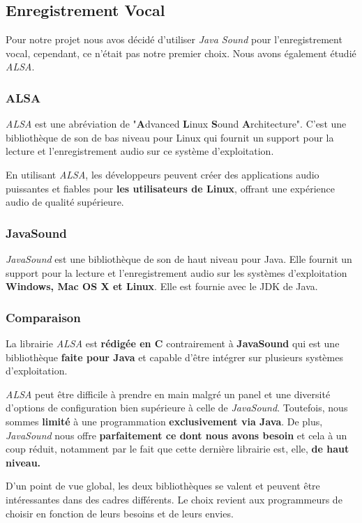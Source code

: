 \subsection{Enregistrement Vocal}
\label{subsec:javaSound}

Pour notre projet nous avos décidé d'utiliser \textit{Java Sound} pour l'enregistrement vocal, cependant,
ce n'était pas notre premier choix. Nous avons également étudié \textit{ALSA}.

\subsubsection*{ALSA}

\textit{ALSA} est une abréviation de "\textbf{A}dvanced \textbf{L}inux \textbf{S}ound \textbf{A}rchitecture". C'est une bibliothèque de son
de bas niveau pour Linux qui fournit un support pour la lecture et l'enregistrement audio sur ce système d'exploitation.

En utilisant \textit{ALSA}, les développeurs peuvent créer des applications audio puissantes et fiables pour \textbf{les utilisateurs de Linux},
offrant une expérience audio de qualité supérieure.\\

\subsubsection*{JavaSound}

\textit{JavaSound} est une bibliothèque de son de haut niveau pour Java. Elle fournit un support pour la lecture et l'enregistrement audio sur
les systèmes d'exploitation \textbf{Windows, Mac OS X et Linux}. Elle est fournie avec le JDK de Java.

\subsubsection*{Comparaison}
La librairie \textit{ALSA} est \textbf{rédigée en C} contrairement à \textbf{JavaSound} qui est une bibliothèque
\textbf{faite pour Java} et capable d'être intégrer sur plusieurs systèmes d'exploitation.

\textit{ALSA} peut être difficile à prendre en main malgré un panel et une diversité d'options de configuration bien supérieure à celle de \textit{JavaSound}.
Toutefois, nous sommes \textbf{limité} à une programmation \textbf{exclusivement via Java}. De plus, \textit{JavaSound} nous offre \textbf{parfaitement ce
    dont nous avons besoin} et cela à un coup réduit, notamment par le fait que cette dernière librairie est, elle, \textbf{de haut niveau.}

D'un point de vue global, les deux bibliothèques se valent et peuvent être intéressantes dans des cadres différents. Le choix revient aux programmeurs
de choisir en fonction de leurs besoins et de leurs envies.
